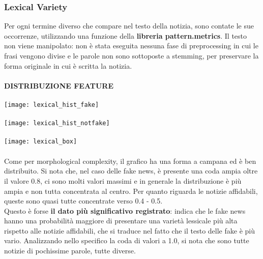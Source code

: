 \documentclass{article}
\begin{document}
\begin{multicols}{2}
				\subsubsection{Lexical Variety}
				Per ogni termine diverso che compare nel testo della notizia, sono contate le sue occorrenze, utilizzando una funzione della \textbf{libreria pattern.metrics}. Il testo non viene manipolato: non è stata eseguita nessuna fase di preprocessing in cui le frasi vengono divise e le parole non sono sottoposte a stemming, per preservare la forma originale in cui è scritta la notizia.
				\\~\\								
				\textbf{DISTRIBUZIONE FEATURE}						
				\\~\\
				\texttt{[image: lexical\_hist\_fake]}
				\\~\\
				\texttt{[image: lexical\_hist\_notfake]}
				\\~\\
				\texttt{[image: lexical\_box]}
				\\~\\
				Come per morphological complexity, il grafico ha una forma a campana ed è ben distribuito. Si nota che, nel caso delle fake news, è presente una coda ampia oltre il valore 0.8, ci sono molti valori massimi e in generale la distribuzione è più ampia e non tutta concentrata al centro. Per quanto riguarda le notizie affidabili, queste sono quasi tutte concentrate verso 0.4 - 0.5.\\
				Questo è forse \textbf{il dato più significativo registrato}: indica che le fake news hanno una probabilità maggiore di presentare una varietà lessicale più alta rispetto alle notizie affidabili, che si traduce nel fatto che il testo delle fake è più vario. Analizzando nello specifico la coda di valori a 1.0, si nota che sono tutte notizie di pochissime parole, tutte diverse.\\~\\
				

\end{multicols}
\end{document}
